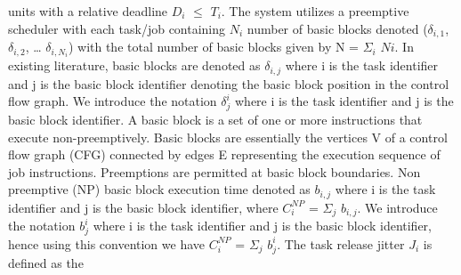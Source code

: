 units with a relative deadline \begin{math}D_{i}\end{math} \begin{math}\leq\end{math} \begin{math}T_{i}\end{math}.  The system utilizes a preemptive scheduler with each task/job containing \begin{math}N_{i}\end{math} number of basic blocks denoted (\begin{math}\delta_{i,1}\end{math}, \begin{math}\delta_{i,2}\end{math}, … \begin{math}\delta_{i,N_{i}}\end{math}) with the total number of basic blocks given by N = \begin{math}\Sigma_{i}\end{math} \begin{math}N{i}\end{math}. In existing literature, basic blocks are denoted as \begin{math}\delta_{i,j}\end{math} where i is the task identifier and j is the basic block identifier denoting the basic block position in the control flow graph.  We introduce the notation \begin{math}\delta_{j}^{i}\end{math} where i is the task identifier and j is the basic block identifier. A basic block is a set of one or more instructions that execute non-preemptively.  Basic blocks are essentially the vertices V of a control flow graph (CFG) connected by edges E representing the execution sequence of job instructions. Preemptions are permitted at basic block boundaries.  Non preemptive (NP) basic block execution time denoted as \begin{math}b_{i,j}\end{math} where i is the task identifier and j is the basic block identifier, where \begin{math}C_{i}^{NP}\end{math} = \begin{math}\Sigma_{j}\end{math} \begin{math}b_{i,j}\end{math}. We introduce the notation \begin{math}b_{j}^{i}\end{math} where i is the task identifier and j is the basic block identifier, hence using this convention we have \begin{math}C_{i}^{NP}\end{math} = \begin{math}\Sigma_{j}\end{math} \begin{math}b_{j}^{i}\end{math}. The task release jitter \begin{math}J_{i}\end{math} is defined as the 